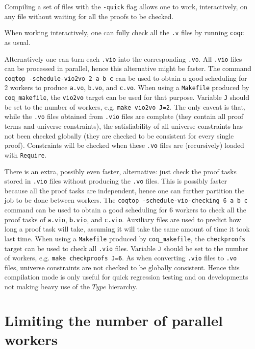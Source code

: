 Compiling a set of files with the \texttt{-quick} flag allows one to work,
interactively, on any file without waiting for all the proofs to be checked.

When working interactively, one can fully check all the \texttt{.v} files by
running \texttt{coqc} as usual.

Alternatively one can turn each \texttt{.vio} into the corresponding
\texttt{.vo}.  All \texttt{.vio} files can be processed in parallel,
hence this alternative might be faster. The command \texttt{coqtop
 -schedule-vio2vo 2 a b c} can be used to obtain a good scheduling for 2
workers to produce \texttt{a.vo}, \texttt{b.vo}, and \texttt{c.vo}. When
using a \texttt{Makefile} produced by \texttt{coq\_makefile}, the
\texttt{vio2vo} target can be used for that purpose.  Variable \texttt{J}
should be set to the number of workers, e.g. \texttt{make vio2vo J=2}.
The only caveat is that, while the \texttt{.vo} files obtained from
\texttt{.vio} files are complete (they contain all proof terms and
universe constraints), the satisfiability of all universe constraints has
not been checked globally (they are checked to be consistent for every
single proof). Constraints will be checked when these \texttt{.vo} files
are (recursively) loaded with \texttt{Require}.

There is an extra, possibly even faster, alternative: just check the
proof tasks stored in \texttt{.vio} files without producing the
\texttt{.vo} files. This is possibly faster because all the proof tasks
are independent, hence one can further partition the job to be done
between workers. The \texttt{coqtop -schedule-vio-checking 6 a b c}
command can be used to obtain a good scheduling for 6 workers to check
all the proof tasks of \texttt{a.vio}, \texttt{b.vio}, and
\texttt{c.vio}. Auxiliary files are used to predict how long a proof task
will take, assuming it will take the same amount of time it took last
time. When using a \texttt{Makefile} produced by \texttt{coq\_makefile},
the \texttt{checkproofs} target can be used to check all \texttt{.vio}
files. Variable \texttt{J} should be set to the number of workers,
e.g. \texttt{make checkproofs J=6}. As when converting \texttt{.vio}
files to \texttt{.vo} files, universe constraints are not checked to be
globally consistent. Hence this compilation mode is only useful for quick
regression testing and on developments not making heavy use of the $Type$
hierarchy.

\section{Limiting the number of parallel workers}
\label{coqworkmgr}

